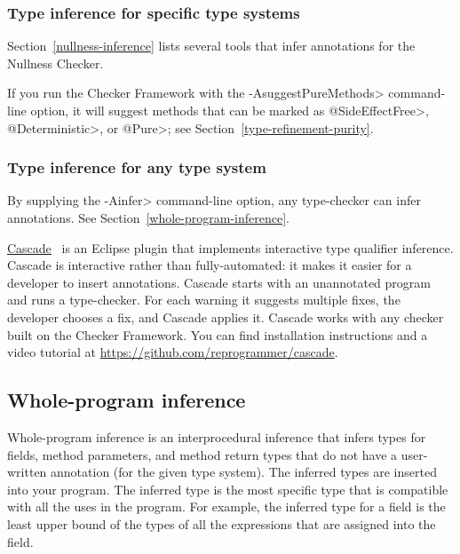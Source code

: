 \subsubsection{Type inference for specific type systems\label{type-inference-tools-specialized}}

Section~\ref{nullness-inference} lists several tools that infer
annotations for the Nullness Checker.

If you run the Checker Framework with the \<-AsuggestPureMethods>
command-line option, it will suggest methods that can be marked as
\<@SideEffectFree>, \<@Deterministic>, or \<@Pure>; see
Section~\ref{type-refinement-purity}.


\subsubsection{Type inference for any type system\label{type-inference-tools-general}}

By supplying the \<-Ainfer> command-line option,
any type-checker can infer annotations. See Section~\ref{whole-program-inference}.

\href{https://github.com/reprogrammer/cascade/}{Cascade}~\cite{VakilianPEJ2014}
is an Eclipse plugin that implements interactive type qualifier inference.
Cascade is interactive rather than fully-automated:  it makes it easier for
a developer to insert annotations.
Cascade starts with an unannotated program and runs a type-checker.  For each
warning it suggests multiple fixes, the developer chooses a fix, and
Cascade applies it.  Cascade works with any checker built on the Checker
Framework.
You can find installation instructions and a video tutorial at \url{https://github.com/reprogrammer/cascade}.


\subsection{Whole-program inference\label{whole-program-inference}}

Whole-program inference is an interprocedural inference that
infers types for fields, method parameters, and method return types that do not
have a user-written annotation (for the given type system).
The inferred types are inserted into
your program.
The inferred type is the most specific type that is compatible with all the
uses in the program.  For example, the inferred type for a field is the
least upper bound of the types of all the expressions that are assigned
into the field.

